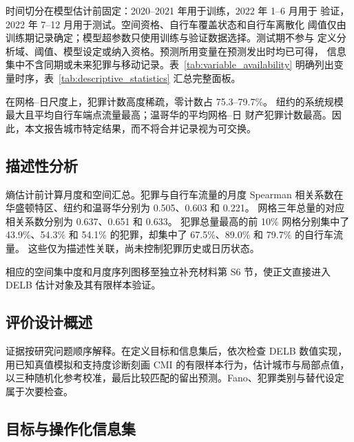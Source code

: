 时间切分在模型估计前固定：2020--2021 年用于训练，2022 年 1--6 月用于
验证，2022 年 7--12 月用于测试。空间资格、自行车覆盖状态和自行车离散化
阈值仅由训练期记录确定；模型超参数只使用训练与验证数据选择。测试期不参与
定义分析域、阈值、模型设定或纳入资格。预测所用变量在预测发出时均已可得，
信息集中不含同期或未来犯罪与移动记录。表~\ref{tab:variable_availability}
明确列出变量时序，表~\ref{tab:descriptive_statistics} 汇总完整面板。




在网格--日尺度上，犯罪计数高度稀疏，零计数占 75.3--79.7\%。
纽约的系统规模最大且平均自行车端点流量最高；温哥华的平均网格--日
财产犯罪计数最高。因此，本文报告城市特定结果，而不将合并记录视为可交换。

\subsection{描述性分析}
\label{subsec:descriptive_analysis}

熵估计前计算月度和空间汇总。犯罪与自行车流量的月度 Spearman
相关系数在华盛顿特区、纽约和温哥华分别为 0.505、0.603 和 0.221。
网格三年总量的对应相关系数分别为 0.637、0.651 和 0.633。
犯罪总量最高的前 10\% 网格分别集中了 43.9\%、54.3\% 和 54.1\%
的犯罪，却集中了 67.5\%、89.0\% 和 79.7\% 的自行车流量。
这些仅为描述性关联，尚未控制犯罪历史或日历状态。

相应的空间集中度和月度序列图移至独立补充材料第 S6 节，使正文直接进入 DELB
估计对象及其有限样本验证。

\subsection{评价设计概述}
\label{sec:methods}

证据按研究问题顺序解释。在定义目标和信息集后，依次检查 DELB 数值实现，
用已知真值模拟和支持度诊断刻画 CMI 的有限样本行为，估计城市与局部点值，
以三种随机化参考校准，最后比较匹配的留出预测。Fano、犯罪类别与替代设定
属于次要检查。

\subsection{目标与操作化信息集}
\label{subsec:operational_information_sets}
\label{subsec:methods_information_sets}

